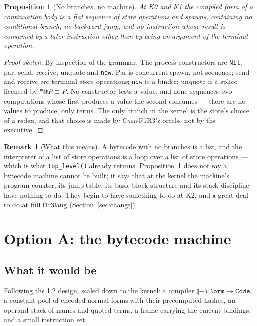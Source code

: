 \documentclass[11pt,a4paper]{article}
\newcommand{\code}[1]{\texttt{#1}}
\newcommand{\Camp}{\textsc{CampF1R3}}
\newcommand{\cmp}[1]{\llparenthesis #1 \rrparenthesis}
\newcommand{\Norm}{\code{Norm}}
\theoremstyle{definition}
\newtheorem{remark}[definition]{Remark}
\theoremstyle{plain}
\newtheorem{proposition}[definition]{Proposition}
\begin{document}
\begin{proposition}[No branches, no machine]\label{prop:nobranch}
At K0 and K1 the compiled form of a continuation body is a flat sequence of
store operations and spawns, containing no conditional branch, no backward
jump, and no instruction whose result is consumed by a later instruction other
than by being an argument of the terminal operation.
\end{proposition}
\begin{proof}[Proof sketch]
By inspection of the grammar. The process constructors are \code{Nil}, par,
send, receive, unquote and \code{new}. Par is concurrent spawn, not sequence;
send and receive are terminal store operations; \code{new} is a binder;
unquote is a splice licensed by $*@P\equiv P$. No constructor tests a value,
and none sequences two computations whose first produces a value the second
consumes --- there are no values to produce, only terms. The only branch in the
kernel is the store's choice of a redex, and that choice is made by \Camp's
oracle, not by the executive.
\end{proof}

\begin{remark}[What this means]
A bytecode with no branches is a list, and the interpreter of a list of store
operations is a loop over a list of store operations --- which is what
\code{top\_level()} already returns. Proposition~\ref{prop:nobranch} does not
say a bytecode machine cannot be built; it says that at the kernel the machine's
program counter, its jump table, its basic-block structure and its stack
discipline have nothing to do. They begin to have something to do at K2, and a
great deal to do at full f1r3lang (Section~\ref{sec:change}).
\end{remark}
\section{Option A: the bytecode machine}\label{sec:A}

\subsection{What it would be}

Following the 1.2 design, scaled down to the kernel: a compiler
$\cmp{-}:\Norm\to\code{Code}$, a constant pool of encoded normal forms with
their precomputed hashes, an operand stack of names and quoted terms, a frame
carrying the current bindings, and a small instruction set.
\end{document}
